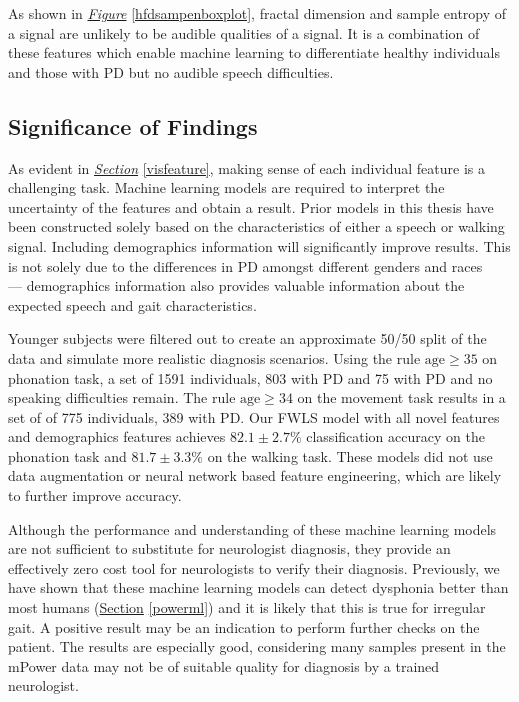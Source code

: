 \documentclass[12pt, twoside]{book}
\begin{document}
As shown in \textit{\hyperref[hfdsampenboxplot]{Figure}} \ref{hfdsampenboxplot}, fractal dimension and sample entropy of a signal are unlikely to be audible qualities of a signal. It is a combination of these features which enable machine learning to differentiate healthy individuals and those with PD but no audible speech difficulties.

\subsection{Significance of Findings}

As evident in \textit{\hyperref[visfeature]{Section}} \ref{visfeature}, making sense of each individual feature is a challenging task. Machine learning models are required to interpret the uncertainty of the features and obtain a result. Prior models in this thesis have been constructed solely based on the characteristics of either a speech or walking signal. Including demographics information will significantly improve results. This is not solely due to the differences in PD amongst different genders and races ~\cite{gender,gendersymptoms,ageracial} --- demographics information also provides valuable information about the expected speech and gait characteristics.

Younger subjects were filtered out to create an approximate 50/50 split of the data and simulate more realistic diagnosis scenarios. Using the rule $\text{age}\geq35$ on phonation task, a set of 1591 individuals, 803 with PD and 75 with PD and no speaking difficulties remain. The rule $\text{age}\geq34$ on the movement task results in a set of of 775 individuals, 389 with PD. Our FWLS model with all novel features and demographics features achieves $82.1\pm2.7\%$ classification accuracy on the phonation task and $81.7\pm3.3\%$  on the walking task. These models did not use data augmentation or neural network based feature engineering, which are likely to further improve accuracy.

Although the performance and understanding of these machine learning models are not sufficient to substitute for neurologist diagnosis, they provide an effectively zero cost tool for neurologists to verify their diagnosis. Previously, we have shown that these machine learning models can detect dysphonia better than most humans (\hyperref[powerml]{Section} \ref{powerml}) and it is likely that this is true for irregular gait. A positive result may be an indication to perform further checks on the patient. The results are especially good, considering many samples present in the mPower data may not be of suitable quality for diagnosis by a trained neurologist.
\end{document}
